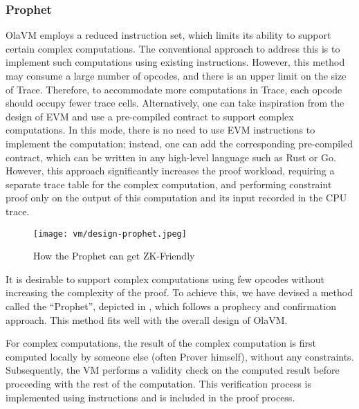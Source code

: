\subsubsection{Prophet} \label{sec:design-prophet}

OlaVM employs a reduced instruction set, which limits its ability to support certain complex computations. The conventional approach to address this is to implement such computations using existing instructions. 
However, this method may consume a large number of opcodes, and there is an upper limit on the size of Trace. 
Therefore, to accommodate more computations in Trace, each opcode should occupy fewer trace cells. Alternatively, one can take inspiration from the design of EVM and use a pre-compiled contract to support complex computations. 
In this mode, there is no need to use EVM instructions to implement the computation; instead, one can add the corresponding pre-compiled contract, which can be written in any high-level language such as Rust or Go. 
However, this approach significantly increases the proof workload, requiring a separate trace table for the complex computation, and performing constraint proof only on the output of this computation and its input recorded in the CPU trace.

\begin{figure}[!ht]
    \centering
    \texttt{[image: vm/design-prophet.jpeg]}
    \caption{How the Prophet can get ZK-Friendly}
    \label{fig:design-prophet}
\end{figure}

It is desirable to support complex computations using few opcodes without increasing the complexity of the proof. 
To achieve this, we have devised a method called the ``Prophet'', depicted in , 
which follows a prophecy and confirmation approach. This method fits well with the overall design of OlaVM.

For complex computations, the result of the complex computation is first computed locally by someone else (often Prover himself), without any constraints. 
Subsequently, the VM performs a validity check on the computed result before proceeding with the rest of the computation. 
This verification process is implemented using instructions and is included in the proof process.

